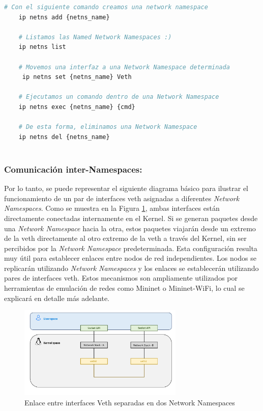 \begin{lstlisting}[language= bash, style=Consola, caption={Casos de uso de las Netns},label=code:iproute2_ns]
    # Con el siguiente comando creamos una network namespace
    ip netns add {netns_name}
    
    # Listamos las Named Network Namespaces :)
    ip netns list
    
    # Movemos una interfaz a una Network Namespace determinada
     ip netns set {netns_name} Veth
    
    # Ejecutamos un comando dentro de una Network Namespace
    ip netns exec {netns_name} {cmd}
    
    # De esta forma, eliminamos una Network Namespace
    ip netns del {netns_name}
    
\end{lstlisting}

\subsubsection{Comunicación inter-Namespaces: }
\label{linuxVeths}

Por lo tanto, se puede representar el siguiente diagrama básico para ilustrar el funcionamiento de un par de interfaces \gls{veth} asignadas a diferentes \textit{Network Namespaces}. Como se muestra en la Figura \ref{fig:linuxNet_veth}, ambas interfaces están directamente conectadas internamente en el Kernel. Si se generan paquetes desde una \textit{Network Namespace} hacia la otra, estos paquetes viajarán desde un extremo de la \gls{veth} directamente al otro extremo de la \gls{veth} a través del Kernel, sin ser percibidos por la \textit{Network Namespace} predeterminada. Esta configuración resulta muy útil para establecer enlaces entre nodos de red independientes. Los nodos se replicarán utilizando \textit{Network Namespaces} y los enlaces se establecerán utilizando pares de interfaces \gls{veth}. Estos mecanismos son ampliamente utilizados por herramientas de emulación de redes como Mininet o Mininet-WiFi, lo cual se explicará en detalle más adelante.

\begin{figure}[ht]
    \centering
    \includegraphics[width=0.7\textwidth]{archivos/img/teoria/user_kernel.png}
    \caption{Enlace entre interfaces Veth separadas en dos Network Namespaces \cite{carrascal2020diseno}}
    \label{fig:linuxNet_veth}
\end{figure}